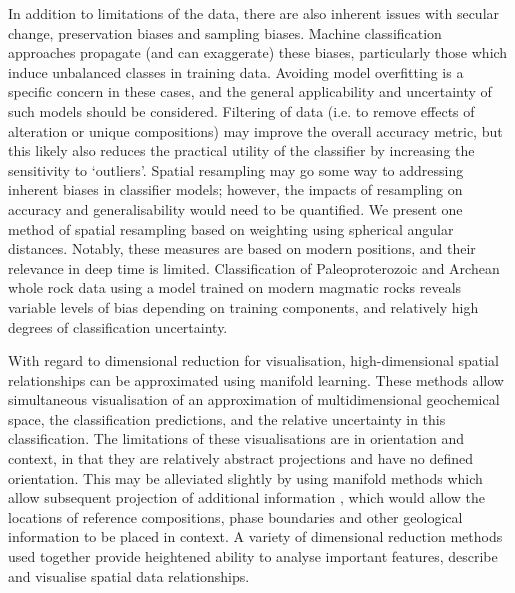 \documentclass[a4,10pt]{article}
\begin{document}
\begin{multicols*}{2}[]
	In addition to limitations of the data, there are also inherent issues with secular change, preservation biases and sampling biases. Machine classification approaches propagate (and can exaggerate) these biases, particularly those which induce unbalanced classes in training data. Avoiding model overfitting is a specific concern in these cases, and the general applicability and uncertainty of such models should be considered. Filtering of data (i.e. to remove effects of alteration or unique compositions) may improve the overall accuracy metric, but this likely also reduces the practical utility of the classifier by increasing the sensitivity to ‘outliers’. Spatial resampling may go some way to addressing inherent biases in classifier models; however, the impacts of resampling on accuracy and generalisability would need to be quantified. We present one method of spatial resampling based on weighting using spherical angular distances. Notably, these measures are based on modern positions, and their relevance in deep time is limited.	Classification of Paleoproterozoic and Archean whole rock data using a model trained on modern magmatic rocks reveals variable levels of bias depending on training components, and relatively high degrees of classification uncertainty.
	
	With regard to dimensional reduction for visualisation, high-dimensional spatial relationships can be approximated using manifold learning. These methods allow simultaneous visualisation of an approximation of multidimensional geochemical space, the classification predictions, and the relative uncertainty in this classification. The limitations of these visualisations are in orientation and context, in that they are relatively abstract projections and have no defined orientation. This may be alleviated slightly by using manifold methods which allow subsequent projection of additional information \citep[which may be possible using Uniform Manifold Approximation and Projection, UMAP;][]{McInnes2018}, which would allow the locations of reference compositions, phase boundaries and other geological information to be placed in context. A variety of dimensional reduction methods used together provide heightened ability to analyse important features, describe and visualise spatial data relationships.
	

\end{multicols*}
\end{document}
